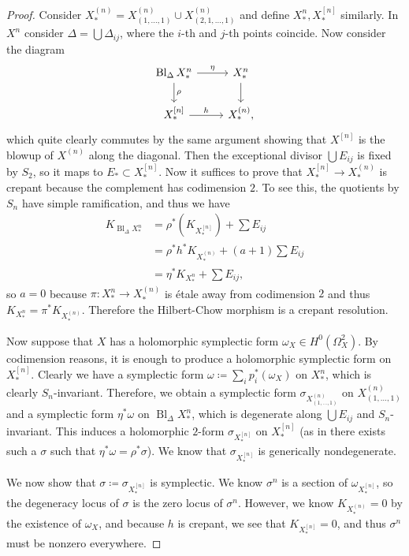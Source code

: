 \documentclass[leqno, openany]{memoir}
\theoremstyle{definition}
\theoremstyle{remark}
\theoremstyle{plain}
\theoremstyle{definition}
\theoremstyle{remark}
\DeclareMathOperator{\Bl}{Bl}
\begin{document}
\begin{proof}
    Consider $X_*^{(n)} = X^{(n)}_{(1,\ldots,1)} \cup X^{(n)}_{(2,1,\ldots,1)}$ and define $X^n_*, X^{[n]}_*$ similarly. In $X^n$ consider $\Delta = \bigcup \Delta_{ij}$, where the $i$-th and $j$-th points coincide. Now consider the diagram
    \begin{equation*}
    \begin{tikzcd}
        \Bl_{\Delta} X_*^n \ar{r}{\eta} \ar{d}{\rho} & X_*^n \ar{d} \\
        X_*^{[n]} \ar{r}{h} & X_*^{(n)},
    \end{tikzcd}
    \end{equation*}
    which quite clearly commutes by the same argument showing that $X^{[n]}$ is the blowup of $X^{(n)}$ along the diagonal. Then the exceptional divisor $\bigcup E_{ij}$ is fixed by $S_2$, so it maps to $E_* \subset X_*^{[n]}$. Now it suffices to prove that $X_*^{[n]} \to X_*^{(n)}$ is crepant because the complement has codimension $2$. To see this, the quotients by $S_n$ have simple ramification, and thus we have
    \begin{align*} 
        K_{\Bl_{\Delta} X_*^n} &= \rho^*(K_{X_*^{[n]}}) + \sum E_{ij} \\
        &= \rho^* h^* K_{X_*^{(n)}} + (a+1) \sum E_{ij} \\
        &= \eta^* K_{X_*^n} + \sum E_{ij},
    \end{align*}
    so $a = 0$ because $\pi \colon X_*^n \to X_*^{(n)}$ is \'etale away from codimension $2$ and thus $K_{X^n_*} = \pi^* K_{X_*^{(n)}}$. Therefore the Hilbert-Chow morphism is a crepant resolution.

    Now suppose that $X$ has a holomorphic symplectic form $\omega_X \in H^0(\Omega^2_X)$. By codimension reasons, it is enough to produce a holomorphic symplectic form on $X_*^{[n]}$. Clearly we have a symplectic form $\omega \coloneqq \sum_i p_i^* (\omega_X)$ on $X_*^n$, which is clearly $S_n$-invariant. Therefore, we obtain a symplectic form $\sigma_{X^{(n)}_{(1,\ldots,1)}}$ on $X^{(n)}_{(1,\ldots,1)}$ and a symplectic form $\eta^* \omega$ on $\Bl_{\Delta} X_*^n$, which is degenerate along $\bigcup E_{ij}$ and $S_n$-invariant. This induces a holomorphic $2$-form $\sigma_{X_*^{[n]}}$ on $X_*^{[n]}$ (as in there exists such a $\sigma$ such that $\eta^* \omega = \rho^* \sigma$). We know that $\sigma_{X_*^{[n]}}$ is generically nondegenerate.

    We now show that $\sigma \coloneqq \sigma_{X_*^{[n]}}$ is symplectic. We know $\sigma^n$ is a section of $\omega_{X_*^{[n]}}$, so the degeneracy locus of $\sigma$ is the zero locus of $\sigma^n$. However, we know $K_{X_*^{(n)}} = 0$ by the existence of $\omega_X$, and because $h$ is crepant, we see that $K_{X_*^[n]} = 0$, and thus $\sigma^n$ must be nonzero everywhere.
\end{proof}
\end{document}
